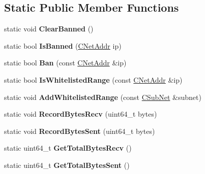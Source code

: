 \subsection*{Static Public Member Functions}
\begin{DoxyCompactItemize}
\item 
\mbox{\label{class_c_node_ad75b43ab81213b74446163211c24246a}} 
static void {\bfseries Clear\+Banned} ()
\item 
\mbox{\label{class_c_node_aefa8b81afa53b4c6635dc4c6c024211a}} 
static bool {\bfseries Is\+Banned} (\mbox{\hyperlink{class_c_net_addr}{C\+Net\+Addr}} ip)
\item 
\mbox{\label{class_c_node_a7d5dd8d7531bfbe069092be583569956}} 
static bool {\bfseries Ban} (const \mbox{\hyperlink{class_c_net_addr}{C\+Net\+Addr}} \&ip)
\item 
\mbox{\label{class_c_node_ad2ccd5d22994f338c9b55ebe7528ea55}} 
static bool {\bfseries Is\+Whitelisted\+Range} (const \mbox{\hyperlink{class_c_net_addr}{C\+Net\+Addr}} \&ip)
\item 
\mbox{\label{class_c_node_ad2c1f955ec23851bd87a6bb144d85d03}} 
static void {\bfseries Add\+Whitelisted\+Range} (const \mbox{\hyperlink{class_c_sub_net}{C\+Sub\+Net}} \&subnet)
\item 
\mbox{\label{class_c_node_af72b4b6e454c743af071896019ae1c69}} 
static void {\bfseries Record\+Bytes\+Recv} (uint64\+\_\+t bytes)
\item 
\mbox{\label{class_c_node_a945c993a84eaa9d6bca18284befaccbe}} 
static void {\bfseries Record\+Bytes\+Sent} (uint64\+\_\+t bytes)
\item 
\mbox{\label{class_c_node_a1988b63b48fdc9b72014bdf9588b0168}} 
static uint64\+\_\+t {\bfseries Get\+Total\+Bytes\+Recv} ()
\item 
\mbox{\label{class_c_node_af318a64e7ddad50d1e1b6fc123a5f0b9}} 
static uint64\+\_\+t {\bfseries Get\+Total\+Bytes\+Sent} ()
\end{DoxyCompactItemize}
